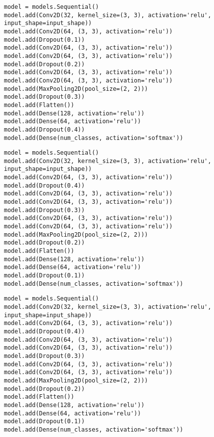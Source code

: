 \documentclass{article}
\begin{document}
\begin{lstlisting}[caption=Increasing dropout values further down the stack, label={lst:inc}]
model = models.Sequential()
model.add(Conv2D(32, kernel_size=(3, 3), activation='relu', input_shape=input_shape))
model.add(Conv2D(64, (3, 3), activation='relu'))
model.add(Dropout(0.1))
model.add(Conv2D(64, (3, 3), activation='relu'))
model.add(Conv2D(64, (3, 3), activation='relu'))
model.add(Dropout(0.2))
model.add(Conv2D(64, (3, 3), activation='relu'))
model.add(Conv2D(64, (3, 3), activation='relu'))
model.add(MaxPooling2D(pool_size=(2, 2)))
model.add(Dropout(0.3))
model.add(Flatten())
model.add(Dense(128, activation='relu'))
model.add(Dense(64, activation='relu'))
model.add(Dropout(0.4))
model.add(Dense(num_classes, activation='softmax'))
\end{lstlisting}

\begin{lstlisting}[caption=Decreasing dropout values further down the stack, label={lst:dec}]
model = models.Sequential()
model.add(Conv2D(32, kernel_size=(3, 3), activation='relu', input_shape=input_shape))
model.add(Conv2D(64, (3, 3), activation='relu'))
model.add(Dropout(0.4))
model.add(Conv2D(64, (3, 3), activation='relu'))
model.add(Conv2D(64, (3, 3), activation='relu'))
model.add(Dropout(0.3))
model.add(Conv2D(64, (3, 3), activation='relu'))
model.add(Conv2D(64, (3, 3), activation='relu'))
model.add(MaxPooling2D(pool_size=(2, 2)))
model.add(Dropout(0.2))
model.add(Flatten())
model.add(Dense(128, activation='relu'))
model.add(Dense(64, activation='relu'))
model.add(Dropout(0.1))
model.add(Dense(num_classes, activation='softmax'))
\end{lstlisting}

\begin{lstlisting}[caption=Constant dropout values, label={lst:const}]
model = models.Sequential()
model.add(Conv2D(32, kernel_size=(3, 3), activation='relu', input_shape=input_shape))
model.add(Conv2D(64, (3, 3), activation='relu'))
model.add(Dropout(0.4))
model.add(Conv2D(64, (3, 3), activation='relu'))
model.add(Conv2D(64, (3, 3), activation='relu'))
model.add(Dropout(0.3))
model.add(Conv2D(64, (3, 3), activation='relu'))
model.add(Conv2D(64, (3, 3), activation='relu'))
model.add(MaxPooling2D(pool_size=(2, 2)))
model.add(Dropout(0.2))
model.add(Flatten())
model.add(Dense(128, activation='relu'))
model.add(Dense(64, activation='relu'))
model.add(Dropout(0.1))
model.add(Dense(num_classes, activation='softmax'))
\end{lstlisting}
\end{document}
